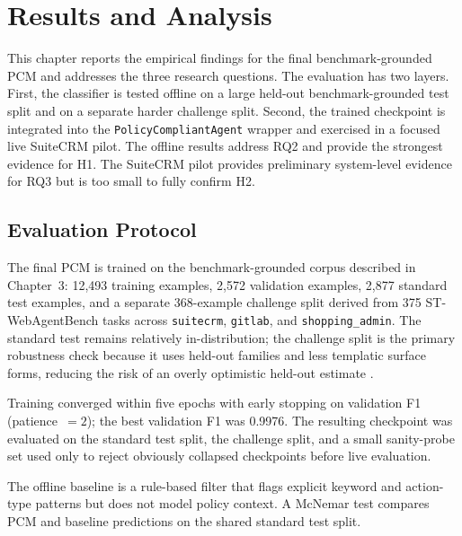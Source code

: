 \documentclass[12pt,a4paper]{article}
\begin{document}
\setcounter{section}{4}
\section{Results and Analysis}
\label{ch:results}

This chapter reports the empirical findings for the final benchmark-grounded PCM
and addresses the three research questions. The evaluation has two layers.
First, the classifier is tested offline on a large held-out benchmark-grounded
test split and on a separate harder challenge split. Second, the trained
checkpoint is integrated into the \texttt{PolicyCompliantAgent} wrapper and
exercised in a focused live SuiteCRM pilot. The offline results address RQ2 and
provide the strongest evidence for H1. The SuiteCRM pilot provides preliminary
system-level evidence for RQ3 but is too small to fully confirm H2.
 
\subsection{Evaluation Protocol}
 
The final PCM is trained on the benchmark-grounded corpus described in
Chapter~3: 12,493 training examples, 2,572 validation examples, 2,877 standard
test examples, and a separate 368-example challenge split derived from 375
ST-WebAgentBench tasks across \texttt{suitecrm}, \texttt{gitlab}, and
\texttt{shopping\_admin}. The standard test remains relatively
in-distribution; the challenge split is the primary robustness check because it
uses held-out families and less templatic surface forms, reducing the risk of
an overly optimistic held-out estimate \citep{xue2025illusion,li2023synthetic}.

Training converged within five epochs with early stopping on validation F1
(patience~$=2$); the best validation F1 was 0.9976. The resulting checkpoint
was evaluated on the standard test split, the challenge split, and a small
sanity-probe set used only to reject obviously collapsed checkpoints before live
evaluation.

The offline baseline is a rule-based filter that flags explicit keyword and
action-type patterns but does not model policy context. A McNemar test
\citep{mcnemar1947note} compares PCM and baseline predictions on the shared
standard test split.
\end{document}
